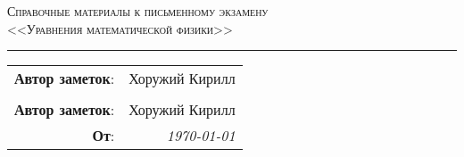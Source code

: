 
\begin{center}
    \LARGE \textsc{Справочные материалы к письменному экзамену \\ <<Уравнения математической физики>>}
\end{center}

\hrule

\phantom{42}

\begin{flushright}
    \begin{tabular}{rr}
        \textbf{Автор заметок}: 
        & Хоружий Кирилл \\
        & \\
        \textbf{Автор заметок}: 
        & Хоружий Кирилл \\
        \textbf{От}: &
        \textit{\today}\\
    \end{tabular}
\end{flushright}



\thispagestyle{empty}
\tableofcontents

\vfill




\newpage
